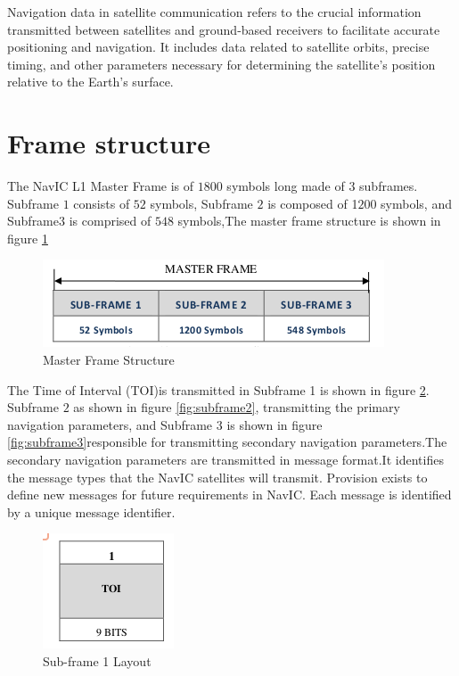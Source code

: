 
Navigation data in satellite communication refers to the crucial information transmitted between satellites and ground-based receivers to facilitate accurate positioning and navigation. It includes data related to satellite orbits, precise timing, and other parameters necessary for determining the satellite's position relative to the Earth's surface.
\section{Frame structure}
The NavIC L1 Master Frame is of $1800$ symbols long made of $3$ subframes. Subframe $1$ consists of $52$ symbols, Subframe $2$ is composed of 1$200$ symbols, and Subframe$3$ is comprised of $548$ symbols,The master frame structure is shown in figure \ref{fig:master_frame}


\begin{figure}[ht]
\centering
\includegraphics[width=0.8\columnwidth]{figs/master_frame.png}
\centering
\captionsetup{justification=centering}
\caption{Master Frame Structure}
\label{fig:master_frame}
\end{figure}


The Time of Interval (TOI)is transmitted in Subframe 1 is shown in figure \ref{fig:subframe1}. Subframe $2$ as shown in figure \ref{fig:subframe2}, transmitting the primary navigation parameters, and Subframe $3$ is shown in figure \ref{fig:subframe3}responsible for transmitting secondary navigation parameters.The secondary navigation parameters are transmitted in message format.It identifies the message types that the NavIC satellites will transmit. Provision exists to define new messages for future requirements in NavIC. Each message is identified by a unique message identifier.
 


\begin{figure}[ht]
\centering
\includegraphics[width=0.4\columnwidth]{figs/subframe1.png}
\centering
\captionsetup{justification=centering}
\caption{ Sub-frame 1 Layout}
\label{fig:subframe1}
\end{figure}

